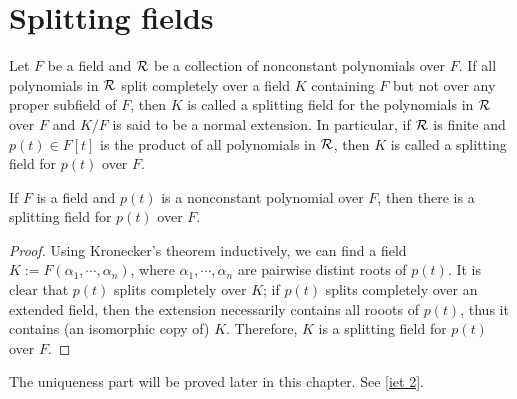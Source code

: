 \section{Splitting fields}

\begin{defi}\label{normal extension}
    Let $F$ be a field and ${\mathcal{R}}$ be a collection of nonconstant polynomials over $F$.
    If all polynomials in ${\mathcal{R}}$ split completely over a field $K$ containing $F$ but not over any proper subfield of $F$, then $K$ is called a splitting field for the polynomials in ${\mathcal{R}}$ over $F$ and $K/F$ is said to be a normal extension.
    In particular, if ${\mathcal{R}}$ is finite and $p(t)\in F[t]$ is the product of all polynomials in ${\mathcal{R}}$, then $K$ is called a splitting field for $p(t)$ over $F$.
\end{defi}
\begin{prop}
    If $F$ is a field and $p(t)$ is a nonconstant polynomial over $F$, then there is a splitting field for $p(t)$ over $F$.
\end{prop}
\begin{proof}
    Using Kronecker's theorem inductively, we can find a field $K:=F(\alpha_1, \cdots, \alpha_n)$, where $\alpha_1, \cdots, \alpha_n$ are pairwise distint roots of $p(t)$.
    It is clear that $p(t)$ splits completely over $K$; if $p(t)$ splits completely over an extended field, then the extension necessarily contains all rooots of $p(t)$, thus it contains (an isomorphic copy of) $K$.
    Therefore, $K$ is a splitting field for $p(t)$ over $F$.
\end{proof}
\begin{rmk}
    The uniqueness part will be proved later in this chapter.
    See \cref{iet 2}.
\end{rmk}

